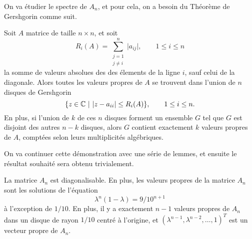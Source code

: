 On va \'etudier le spectre de $A_{n}$, et pour cela, on a besoin du Th\'eor\`eme
de Gershgorin \cite[Th\'eor\`eme 6.1.1]{matrix} comme suit.
\begin{thm}[Gershgorin]
	Soit $A$ matrice de taille $n\times n$, et soit
	\[
		R_{i}(A) = \sum_{\substack{j=1\\ j\ne i}}^{n}\vert a_{ij}\vert, \qquad
		1\le i\le n
	\]
	la somme de valeurs absolues des des \'elements de la ligne $i$, sauf celui
	de la diagonale. Alors toutes les valeurs propres de $A$ se trouvent dans
	l'union de $n$ disques de Gershgorin
	\[
		\{z\in\mathbb{C} \text{ }\vert \text{ } \vert z-a_{ii}\vert \le R_{i}(A)\},
		\qquad 1\le i \le n.
	\]
	En plus, si l'union de $k$ de ces $n$ disques forment un ensemble $G$ tel
	que $G$ est disjoint des autres $n-k$ disques, alors $G$ contient
	exactement $k$ valeurs propres de $A$, compt\'ees selon leurs
	multiplicit\'es alg\'ebriques.
\end{thm}
On va continuer cette d\'emonstration avec une s\'erie de lemmes, et ensuite le
r\'esultat souhait\'e sera obtenu trivialement.
\begin{lem}
	La matrice $A_{n}$ est diagonalisable. En plus, les valeurs propres de la
	matrice $A_{n}$ sont les solutions de l'\'equation
	\begin{equation}
		\lambda^{n}(1-\lambda) = 9/10^{n+1}
		\label{eq:eigens}
	\end{equation}
	\`a l'exception de $1/10$. En plus, il y a exactement $n-1$ valeurs propres
	de $A_{n}$ dans un disque de rayon $1/10$ centr\'e \`a l'origine, et
	$(\lambda^{n-1}, \lambda^{n-2}, \ldots, 1)^{T}$ est un vecteur propre de
	$A_{n}$.
\end{lem}
